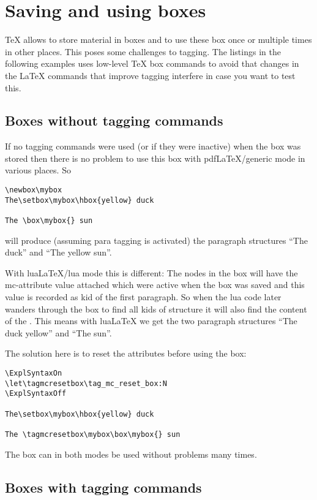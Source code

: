 \documentclass{article}
\begin{document}
\section{Saving and using boxes}

\TeX{} allows to store material in boxes and to use these box once or multiple times in other places.
This poses some challenges to tagging. The listings in the following examples uses low-level \TeX{} box
commands to avoid that changes in the \LaTeX{} commands that improve tagging interfere in case you want to 
test this.

\subsection{Boxes without tagging commands}


If no tagging commands were used (or if they were inactive) when the box was stored then
there is no problem to use this box with pdf\LaTeX{}/generic mode in various places. So

\begin{verbatim}
\newbox\mybox
The\setbox\mybox\hbox{yellow} duck

The \box\mybox{} sun
\end{verbatim}

will produce (assuming para tagging is activated) the paragraph structures \enquote{The duck} and \enquote{The yellow sun}.


With lua\LaTeX{}/lua mode this is different: The nodes in the box will have the mc-attribute value attached which were
active when the box was saved and this value is recorded as kid of the first paragraph. So when the lua code later wanders through the box to find all kids of structure it will also find the content of the . This means with lua\LaTeX{} we get the two paragraph structures \enquote{The duck yellow} and \enquote{The sun}. 

The solution here is to reset the attributes before using the box:

\begin{verbatim}
\ExplSyntaxOn
\let\tagmcresetbox\tag_mc_reset_box:N
\ExplSyntaxOff

The\setbox\mybox\hbox{yellow} duck

The \tagmcresetbox\mybox\box\mybox{} sun
\end{verbatim}


The box can in both modes be used without problems many times.


\subsection{Boxes with tagging commands}
\end{document}

